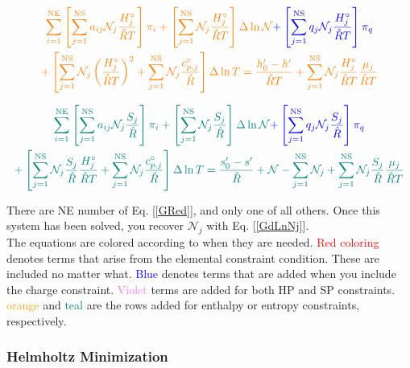 \documentclass[10pt]{article}
\begin{document}
\begin{flushleft}
\begin{multline}
    \textcolor{orange}{\sum_{i=1}^\text{NE} \left[ \sum_{j=1}^\text{NS} a_{ij} \mathcal{N}_j \frac{H_j^\circ}{\hat{R}T} \right] \pi_i + \left[ \sum_{j=1}^\text{NS} \mathcal{N}_j \frac{H_j^\circ}{\hat{R}T} \right] \Delta \ln \mathcal{N}} \textcolor{blue}{+ \left[ \sum_{j=1}^\text{NS} q_j \mathcal{N}_j \frac{H_j^\circ}{\hat{R}T} \right] \pi_q} 
    \\ \textcolor{orange}{+ \left[ \sum_{j=1}^\text{NS} \mathcal{N}_j \left( \frac{H_j^\circ}{\hat{R}T} \right)^2 + \sum_{j=1}^\text{NS} \mathcal{N}_j \frac{c_{p,j}^\circ}{\hat{R}} \right] \Delta \ln T = \frac{h_0' - h'}{\hat{R}T} + \sum_{j=1}^\text{NS} \mathcal{N}_j \frac{H_j^\circ}{\hat{R}T} \frac{\mu_j}{\hat{R}T}}
\end{multline}


\begin{multline}
    \textcolor{teal}{\sum_{i=1}^\text{NE} \left[ \sum_{j=1}^\text{NS} a_{ij} \mathcal{N}_j \frac{S_j}{\hat{R}} \right] \pi_i + \left[ \sum_{j=1}^\text{NS} \mathcal{N}_j \frac{S_j}{\hat{R}} \right] \Delta \ln \mathcal{N}} \textcolor{blue}{+ \left[ \sum_{j=1}^\text{NS} q_j \mathcal{N}_j \frac{S_j}{\hat{R}} \right] \pi_q} 
    \\ \textcolor{teal}{+ \left[ \sum_{j=1}^\text{NS} \mathcal{N}_j \frac{S_j}{\hat{R}} \frac{H_j^\circ}{\hat{R}T} + \sum_{j=1}^\text{NS} \mathcal{N}_j \frac{c_{p,j}^\circ}{\hat{R}} \right] \Delta \ln T = \frac{s_0' - s'}{\hat{R}} + \mathcal{N} - \sum_{j=1}^\text{NS} \mathcal{N}_j + \sum_{j=1}^\text{NS} \mathcal{N}_j \frac{S_j}{\hat{R}} \frac{\mu_j}{\hat{R}T} }
\end{multline}

There are NE number of Eq. [\ref{GRed}], and only one of all others. Once this system has been solved, you recover $\mathcal{N}_j$ with Eq. [\ref{GdLnNj}]. 
\vspace{5mm}
\\ The equations are colored according to when they are needed. \textcolor{red}{Red coloring} denotes terms that arise from the elemental constraint condition. These are included no matter what. \textcolor{blue}{Blue} denotes terms that are added when you include the charge constraint. \textcolor{violet}{Violet} terms are added for both HP and SP constraints. \textcolor{orange}{orange} and \textcolor{teal}{teal} are the rows added for enthalpy or entropy constraints, respectively.


\subsubsection{Helmholtz Minimization}


\end{flushleft}
\end{document}
